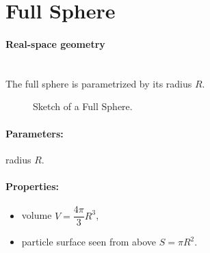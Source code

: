 \newpage%
\section{Full Sphere} 

\paragraph{Real-space geometry}\mbox{}\\
The full sphere is parametrized by its radius $R$. 

\begin{figure}[ht]
\hfill
{}
\hfill
{}
\hfill
\caption{Sketch of a Full Sphere.}
\label{fig:fullsphere}
\end{figure}

\FloatBarrier

\paragraph{Parameters:} radius $R$.

\paragraph{Properties:}
\begin{itemize}
\item volume $V = \dfrac{4\pi}{3}R^3$,
\item particle surface seen from above $S= \pi R^2$.
\end{itemize}

